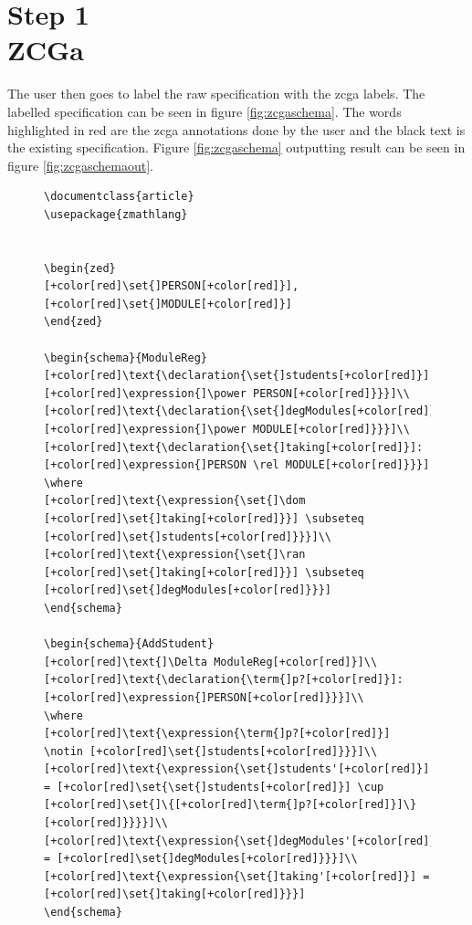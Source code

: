 \section{Step 1\\ZCGa}

The user then goes to label the raw specification with the \gls{zcga} labels. The labelled specification can be seen in figure \ref{fig:zcgaschema}. The words highlighted in {\color{red}red} are the \gls{zcga} annotations done by the user and the black text is the existing specification. Figure \ref{fig:zcgaschema} outputting result can be seen in figure \ref{fig:zcgaschemaout}.

\begin{figure}[H]
\centering
\begin{minipage}{0.45\textwidth}
\centering
\begin{tiny}
\begin{BVerbatim}[commandchars=+\[\]]
\documentclass{article}
\usepackage{zmathlang}


\begin{zed}
[+color[red]\set{]PERSON[+color[red]}], [+color[red]\set{]MODULE[+color[red]}]
\end{zed}

\begin{schema}{ModuleReg}
[+color[red]\text{\declaration{\set{]students[+color[red]}]:[+color[red]\expression{]\power PERSON[+color[red]}}}]\\
[+color[red]\text{\declaration{\set{]degModules[+color[red]}]:[+color[red]\expression{]\power MODULE[+color[red]}}}]\\
[+color[red]\text{\declaration{\set{]taking[+color[red]}]:[+color[red]\expression{]PERSON \rel MODULE[+color[red]}}}]
\where
[+color[red]\text{\expression{\set{]\dom [+color[red]\set{]taking[+color[red]}}] \subseteq [+color[red]\set{]students[+color[red]}}}]\\
[+color[red]\text{\expression{\set{]\ran [+color[red]\set{]taking[+color[red]}}] \subseteq [+color[red]\set{]degModules[+color[red]}}}]
\end{schema}

\begin{schema}{AddStudent}
[+color[red]\text{]\Delta ModuleReg[+color[red]}]\\
[+color[red]\text{\declaration{\term{]p?[+color[red]}]:[+color[red]\expression{]PERSON[+color[red]}}}]\\
\where
[+color[red]\text{\expression{\term{]p?[+color[red]}] \notin [+color[red]\set{]students[+color[red]}}}]\\
[+color[red]\text{\expression{\set{]students'[+color[red]}] = [+color[red]\set{\set{]students[+color[red]}] \cup
[+color[red]\set{]\{[+color[red]\term{]p?[+color[red]}]\}[+color[red]}}}}]\\
[+color[red]\text{\expression{\set{]degModules'[+color[red]}] = [+color[red]\set{]degModules[+color[red]}}}]\\
[+color[red]\text{\expression{\set{]taking'[+color[red]}] = [+color[red]\set{]taking[+color[red]}}}]
\end{schema}


\end{BVerbatim}
\end{tiny}
\end{minipage}
\end{figure}
